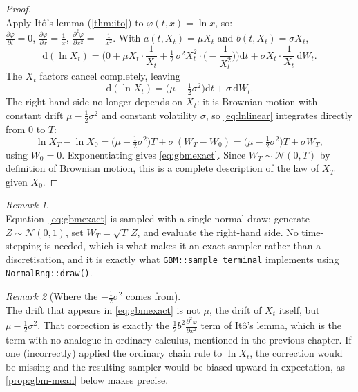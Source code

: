 \documentclass[11pt]{report}
\newcommand{\dd}{\mathrm{d}}
\newcommand{\dW}{\dd W_t}
\newcommand{\dt}{\dd t}
\newcommand{\drift}{a}
\newcommand{\diff}{b}
\theoremstyle{plain}
\theoremstyle{definition}
\theoremstyle{remark}
\newtheorem{remark}{Remark}[chapter]
\numberwithin{equation}{chapter}
\begin{document}
\begin{proof}
\leavevmode\\
Apply It\^o's lemma (\cref{thm:ito}) to
$\varphi(t,x)=\ln x$,
so:
\\$\frac{\partial\varphi}{\partial t}=0$, $\frac{\partial\varphi}{\partial x}=\frac{1}{x}$, $\frac{\partial^2\varphi}{\partial x^2}=-\frac{1}{x^2}$. With
$\drift(t,X_t)=\mu X_t$ and $\diff(t,X_t)=\sigma X_t$,
\[
   \dd(\ln X_t)
     = \Big( 0 + \mu X_t\cdot\frac1{X_t}
             + \tfrac12\,\sigma^2 X_t^2\cdot\Big(\!-\frac1{X_t^2}\Big) \Big)\dt
       + \sigma X_t\cdot\frac1{X_t}\,\dW .
\]
The $X_t$ factors cancel completely, leaving
\begin{equation}\label{eq:lnlinear}
   \dd(\ln X_t) = \Big(\mu-\tfrac12\sigma^2\Big)\dt + \sigma\,\dW .
\end{equation}
The right-hand side no longer depends on $X_t$: it is Brownian motion
with constant drift $\mu-\tfrac12\sigma^2$ and constant volatility
$\sigma$, so \eqref{eq:lnlinear} integrates directly from $0$ to $T$:
\[
   \ln X_T - \ln X_0
     = \Big(\mu-\tfrac12\sigma^2\Big)T + \sigma\,(W_T-W_0)
     = \Big(\mu-\tfrac12\sigma^2\Big)T + \sigma W_T,
\]
using $W_0=0$. Exponentiating gives \eqref{eq:gbmexact}. Since $W_T\sim
\mathcal N(0,T)$ by definition of Brownian motion, this is a complete
description of the law of $X_T$ given $X_0$.
\end{proof}

\begin{remark}
  \leavevmode\\
Equation~\eqref{eq:gbmexact} is sampled with a single normal draw: generate
$Z\sim\mathcal N(0,1)$, set $W_T=\sqrt T\,Z$, and evaluate the
right-hand side. No time-stepping is needed, which is what makes it
an exact sampler rather than a discretisation, and it is exactly
what \texttt{GBM::sample\_terminal} implements using
\texttt{NormalRng::draw()}.
\end{remark}

\begin{remark}[Where the $-\tfrac12\sigma^2$ comes from]
  \leavevmode\\
The drift that appears in \eqref{eq:gbmexact} is not $\mu$, the
drift of $X_t$ itself, but $\mu-\tfrac12\sigma^2$. That correction is
exactly the $\tfrac12\diff^2 \frac{\partial^2\varphi}{\partial x^2}$ term of It\^o's lemma, which is the term
with no analogue in ordinary calculus, mentioned in the previous chapter. If one (incorrectly) applied the
ordinary chain rule to $\ln X_t$, the correction would be missing and
the resulting sampler would be biased upward in expectation, as
\cref{prop:gbm-mean} below makes precise.
\end{remark}
\end{document}
